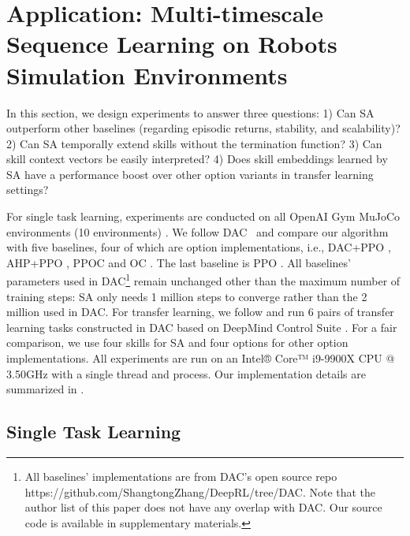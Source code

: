 
\chapter{Application: Multi-timescale Sequence Learning on Robots
  Simulation Environments}
\label{cha:sa_app}

In this section, we design experiments to answer three questions:
1) Can SA outperform other baselines (regarding episodic returns,
stability, and scalability)? 2) Can SA temporally extend skills
without the termination function? 3) Can skill context vectors be
easily interpreted? 4) Does skill embeddings learned by SA have a
performance boost over other option variants in transfer learning
settings?

For single task learning, experiments are conducted on all OpenAI
Gym MuJoCo environments (10 environments)
\cite{brockman2016openai}. We follow DAC~\cite{zhang2019dac} and
compare our algorithm with five baselines, four of which are
option implementations, i.e., DAC+PPO \cite{zhang2019dac},
AHP+PPO \cite{levy2011unified}, PPOC
\cite{klissarov2017learnings} and OC \cite{bacon2017option}. The
last baseline is PPO \cite{schulman2017proximal}. All baselines'
parameters used in DAC\footnote{All baselines' implementations
  are from DAC's open source repo
  https://github.com/ShangtongZhang/DeepRL/tree/DAC. Note that
  the author list of this paper does not have any overlap with
  DAC. Our source code is available in supplementary materials.}
remain unchanged other than the maximum number of training steps:
SA only needs 1 million steps to converge rather than the 2
million used in DAC. For transfer learning, we follow
 and run 6 pairs of transfer learning
tasks constructed in DAC based on DeepMind Control Suite
\cite{tassa2020dmcontrol}. For a fair comparison, we use four
skills for SA and four options for other option implementations.
All experiments are run on an Intel® Core™ i9-9900X CPU @ 3.50GHz
with a single thread and process. Our implementation details are
summarized in .

\section{Single Task Learning}
\label{sec:exp_perf}
